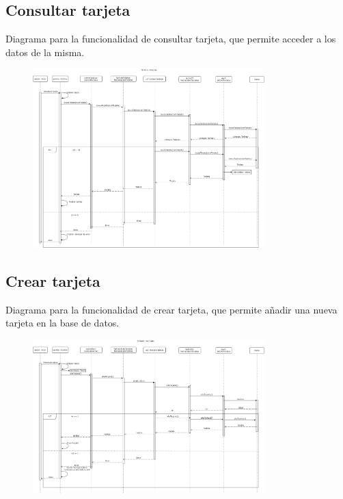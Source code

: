 \documentclass[12pt]{article}
\begin{document}
\subsection{Consultar tarjeta}
Diagrama para la funcionalidad de consultar tarjeta, que permite acceder a los datos de la misma.
\begin{figure}[H]
    \centering
    \includegraphics[width=0.8\textwidth]{images/consultarTarjeta.png}
\end{figure}
\subsection{Crear tarjeta}
Diagrama para la funcionalidad de crear tarjeta, que permite añadir una nueva tarjeta en la base de datos.
\begin{figure}[H]
    \centering
    \includegraphics[width=0.8\textwidth]{images/14-Gestor_crea_tarjeta.png}
\end{figure}
\end{document}

